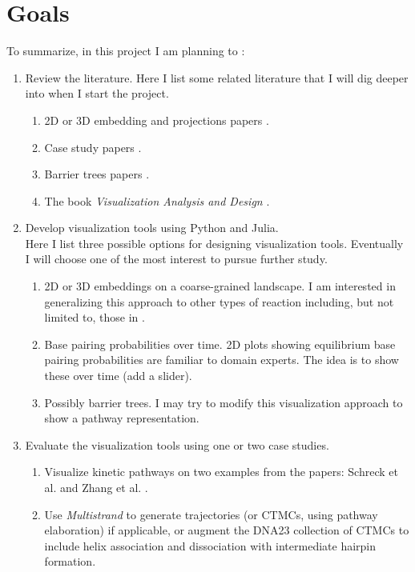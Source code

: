 \documentclass{article}
\begin{document}
\section*{Goals}
To summarize, in this project I am planning to :
\begin{enumerate}
	\item Review the literature. Here I list some related literature that I will dig deeper into when I start the project.
		\begin{enumerate}
			\item 2D or 3D embedding and projections papers \cite{deepgraph,PHATE,Manifold,projlandscape}.
			\item Case study papers \cite{domaincoarse,zhang2007,cotranscriptional,rnamovie,DSD}.
			\item Barrier trees papers \cite{barriertrees,Badelt}.
			\item The book \textit{Visualization Analysis and Design} \cite{tamara}.
		\end{enumerate}
	\item Develop visualization tools using Python and Julia. \\
	Here I list three possible options for designing visualization tools. Eventually I will choose one of the most interest to pursue further study.
		\begin{enumerate}
			\item 2D or 3D embeddings on a coarse-grained landscape. I am interested in generalizing this approach to other types of reaction including, but not limited to, those in \cite{DNA23}.
			\item Base pairing probabilities over time. 2D plots showing equilibrium base pairing probabilities are familiar to domain experts. The idea is to show these over time (add a slider).
			\item Possibly barrier trees. I may try to modify this visualization approach to show a pathway representation. 
		\end{enumerate}
	\item Evaluate the visualization tools using one or two case studies. 
	\begin{enumerate}
		\item Visualize kinetic pathways on two examples from the papers: Schreck et al. \cite{schreck} and Zhang et al. \cite{zhang2007}.
		\item Use \textit{Multistrand} to generate trajectories (or CTMCs, using pathway elaboration) if applicable, or augment the DNA23 collection of CTMCs to include helix association and dissociation with intermediate hairpin formation.
	\end{enumerate}
	

\end{enumerate}
\end{document}
